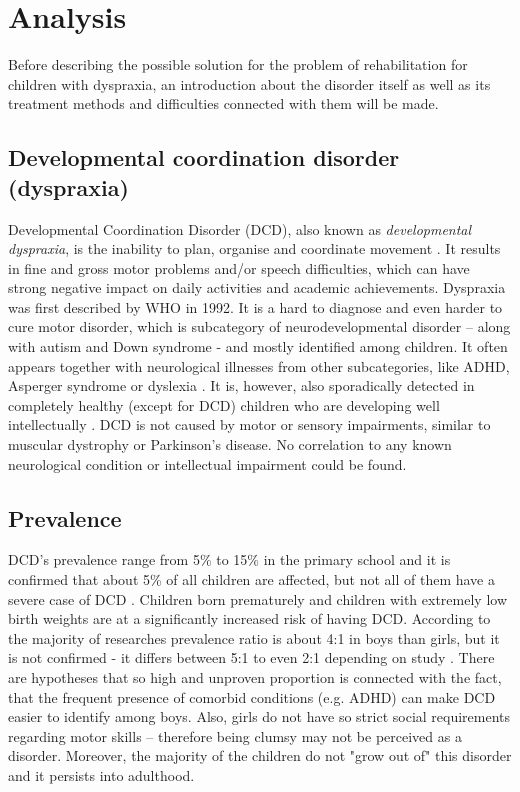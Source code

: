 \chapter{Analysis}
\label{analysis}
Before describing the possible solution for the problem of rehabilitation for children with dyspraxia, an introduction about the disorder itself as well as its treatment methods and difficulties connected with them will be made. %

\section{Developmental coordination disorder (dyspraxia)}

Developmental Coordination Disorder (DCD), also known as \emph{developmental dyspraxia}, is the inability to plan, organise and coordinate movement \cite{4}. It results in fine and gross motor problems and/or speech difficulties, which can have strong negative impact on daily activities and academic achievements. Dyspraxia was first described by WHO in 1992. It is a hard to diagnose and even harder to cure motor disorder, which is subcategory of neurodevelopmental disorder – along with autism and Down syndrome - and mostly identified among children. It often appears together with neurological illnesses from other subcategories, like ADHD, Asperger syndrome or dyslexia \cite{20}. It is, however, also sporadically detected in completely healthy (except for DCD) children who are developing well intellectually \cite{20}. DCD is not caused by motor or sensory impairments, similar to muscular dystrophy or Parkinson's disease. No correlation to any known neurological condition or intellectual impairment could be found.

\section{Prevalence}
DCD’s prevalence range from 5\% to 15\% in the primary school and it is confirmed that about 5\% of all children are affected, but not all of them have a severe case of DCD \cite{20}. Children born prematurely \cite{1} and children with extremely low birth weights \cite{21} are at a significantly increased risk of having DCD. According to the majority of researches prevalence ratio is about 4:1 in boys than girls, but it is not confirmed - it differs between 5:1 to even 2:1 depending on study \cite{20}. There are hypotheses that so high and unproven proportion is connected with the fact, that the frequent presence of comorbid conditions (e.g. ADHD) can make DCD easier to identify among boys. %
Also, girls do not have so strict social requirements regarding motor skills – therefore being clumsy may not be perceived as a disorder. 
Moreover, the majority of the children do not "grow out of" this disorder and it persists into adulthood.

